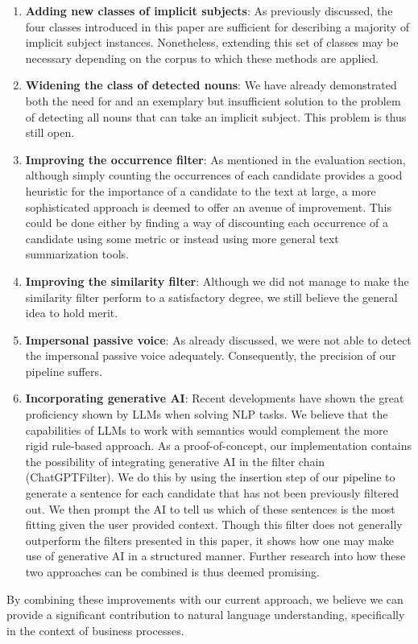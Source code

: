 \documentclass[times, 10pt,twocolumn]{article}
\begin{document}
\begin{enumerate}
   \item \textbf{Adding new classes of implicit subjects}: As previously discussed, the
   four classes introduced in this paper are sufficient for describing a majority of
   implicit subject instances. Nonetheless, extending this set of classes may be necessary
   depending on the corpus to which these methods are applied.
   \item \textbf{Widening the class of detected nouns}: We have already demonstrated both
   the need for and an exemplary but insufficient solution to the problem of detecting all
   nouns that can take an implicit subject. This problem is thus still open.  
   \item \textbf{Improving the occurrence filter}: As mentioned in the evaluation section,
   although simply counting the occurrences of each candidate provides a good heuristic for
   the importance of a candidate to the text at large, a more sophisticated approach is deemed
   to offer an avenue of improvement. This could be done either by finding a way of discounting
   each occurrence of a candidate using some metric or instead using more general text summarization
   tools.
   \item \textbf{Improving the similarity filter}: Although we did not manage to make the similarity
   filter perform to a satisfactory degree, we still believe the general idea to hold merit.
   \item \textbf{Impersonal passive voice}: As already discussed, we were not able to detect
   the impersonal passive voice adequately. Consequently, the precision of our pipeline suffers.
   \item \textbf{Incorporating generative AI}: Recent developments have shown the great proficiency
   shown by LLMs when solving NLP tasks. We believe that the capabilities of LLMs to work with semantics
   would complement the more rigid rule-based approach. As a proof-of-concept, our implementation
   contains the possibility of integrating generative AI \cite{openai:2022} in the filter chain (ChatGPTFilter).
   We do this by using the insertion step of
   our pipeline to generate a sentence for each candidate that has not been previously filtered out.
   We then prompt the AI to tell us which of these sentences is the most fitting given the
   user provided context.
   Though this filter does not generally outperform the filters presented in this paper, it shows how one
   may make use of generative AI in a structured manner. Further research into how these two approaches can be combined is thus deemed
   promising.
\end{enumerate}

By combining these improvements with our current approach, we believe we can provide a significant 
contribution to natural language understanding, specifically in the context of business processes.





\end{document}
